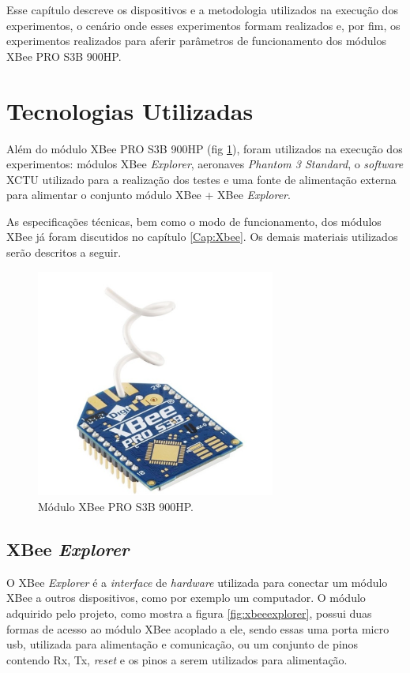 \label{Cap:Procedimento}

Esse capítulo descreve os dispositivos e a metodologia utilizados na execução dos experimentos, o cenário onde esses experimentos formam realizados e, por fim, os experimentos realizados para aferir parâmetros de funcionamento dos módulos XBee PRO S3B 900HP.

\section{Tecnologias Utilizadas}

Além do módulo XBee PRO S3B 900HP (fig \ref{fig:xbeepro}), foram utilizados na execução dos experimentos: módulos XBee \emph{Explorer}, aeronaves \emph{Phantom 3 Standard}, o \emph{software} XCTU utilizado para a realização dos testes e uma fonte de alimentação externa para alimentar o conjunto módulo XBee + XBee \emph{Explorer}.

As especificações técnicas, bem como o modo de funcionamento, dos módulos XBee já foram discutidos no capítulo \ref{Cap:Xbee}. Os demais materiais utilizados serão descritos a seguir.

\begin{figure}[h!] 
\center
\includegraphics[width=0.7\textwidth]{xbeepro.png}
\caption{Módulo XBee PRO S3B 900HP.} 
\label{fig:xbeepro}
\end{figure}

\subsection{XBee \emph{Explorer}}

O XBee \emph{Explorer} é a \emph{interface} de \emph{hardware} utilizada para conectar um módulo XBee a outros dispositivos, como por exemplo um computador. O módulo adquirido pelo projeto, como mostra a figura \ref{fig:xbeeexplorer}, possui duas formas de acesso ao módulo XBee acoplado a ele, sendo essas uma porta micro usb, utilizada para alimentação e comunicação, ou um conjunto de pinos contendo Rx, Tx, \emph{reset} e os pinos a serem utilizados para alimentação.


